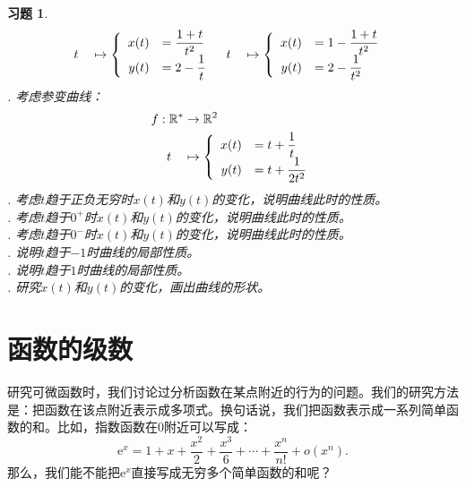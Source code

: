 \documentclass[12pt,UTF8]{ctexbook}
\newcommand{\olim}[1]{\mathit{o}\left(#1\right)}  %
\theoremstyle{definition}
\theoremstyle{plain}
\newtheorem{xt}{习题}[section]
\begin{document}
\begin{xt}
\begin{align*}
        \;\;t\quad &\mapsto\left\{
            \begin{array}[]{rl}
                x(t) &\displaystyle = \frac{1+t}{t^2} \\
                y(t) &\displaystyle = 2 - \frac{1}{t} \\
            \end{array}
        \right.
        & 
        t\quad &\mapsto\left\{
            \begin{array}[]{rl}
                x(t) &\displaystyle = 1 - \frac{1+t}{t^2} \\
                y(t) &\displaystyle = 2 - \frac{1}{t^2} \\
            \end{array}
        \right.
    \end{align*}
    . 考虑参变曲线：
    \begin{align*}
        f: \mathbb{R}^* &\rightarrow \mathbb{R}^2 \\
        t\quad &\mapsto\left\{
            \begin{array}[]{rl}
                x(t) &\displaystyle = t + \frac{1}{t} \\
                y(t) &\displaystyle = t + \frac{1}{2t^2} \\
            \end{array}
        \right.
    \end{align*}
    . 考虑$t$趋于正负无穷时$x(t)$和$y(t)$的变化，说明曲线此时的性质。\\
    . 考虑$t$趋于$0^+$时$x(t)$和$y(t)$的变化，说明曲线此时的性质。\\
    . 考虑$t$趋于$0^-$时$x(t)$和$y(t)$的变化，说明曲线此时的性质。\\
    . 说明$t$趋于$-1$时曲线的局部性质。\\
    . 说明$t$趋于$1$时曲线的局部性质。\\
    . 研究$x(t)$和$y(t)$的变化，画出曲线的形状。
\end{xt}

\chapter{函数的级数}

研究可微函数时，我们讨论过分析函数在某点附近的行为的问题。我们的研究方法是：把函数在该点附近表示成多项式。换句话说，我们把函数表示成一系列简单函数的和。比如，指数函数在$0$附近可以写成：
$$\mathrm{e}^x = 1 + x + \frac{x^2}{2} + \frac{x^3}{6} + \cdots + \frac{x^n}{n!} + \olim{x^n}.$$
那么，我们能不能把$\mathrm{e}^x$直接写成无穷多个简单函数的和呢？
\end{document}
